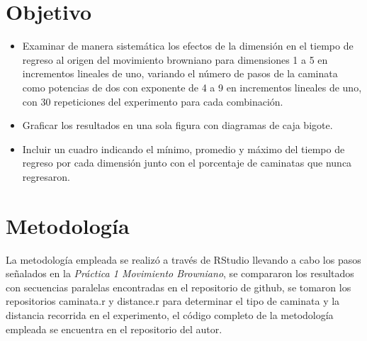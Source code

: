 \documentclass[a4paper]{article}
\begin{document}
\section{Objetivo}  %
\begin{itemize}   %
    \item Examinar de manera sistemática los efectos de la dimensión en el tiempo de regreso al origen del movimiento browniano para dimensiones 1 a 5 en incrementos lineales de uno, variando el número de pasos de la caminata como potencias de dos con exponente de 4 a 9 en incrementos lineales de uno, con 30 repeticiones del experimento para cada combinación.\cite{ejemplo}   %
    \item Graficar los resultados en una sola figura con diagramas de caja bigote.\cite{ejemplo}
    \item Incluir un cuadro indicando el mínimo, promedio y máximo del tiempo de regreso por cada dimensión junto con el porcentaje de caminatas que nunca regresaron.\cite{ejemplo}   %
\end{itemize}

\section{Metodología}
\justify
La metodología empleada se realizó a través de RStudio\cite{rstudio} llevando a cabo los pasos señalados en la \textit{Práctica 1 Movimiento Browniano},\cite{ejemplo} se compararon los resultados con secuencias paralelas\cite{parallel} encontradas en el repositorio de github,\cite{git} se tomaron los repositorios caminata.r\cite{caminata} y distance.r\cite{distance} para determinar el tipo de caminata y la distancia recorrida en el experimento,  el código completo de la metodología empleada se encuentra en el repositorio\cite{gitadrian} del autor.
\end{document}

